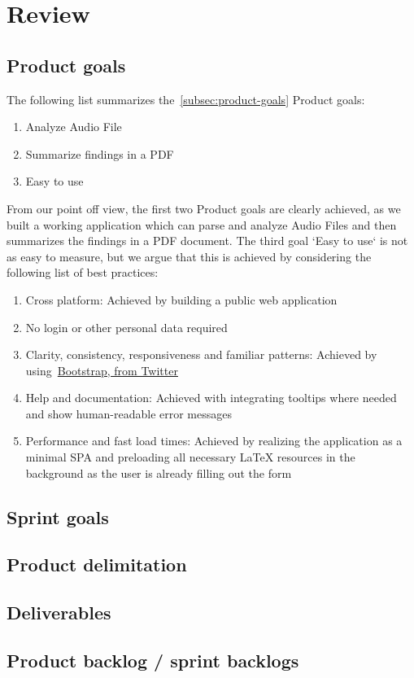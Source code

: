 \section{Review}\label{sec:review}

\subsection{Product goals}\label{subsec:product-goals-review}
The following list summarizes the~\ref{subsec:product-goals} Product goals:

\begin{enumerate}
    \item Analyze Audio File
    \item Summarize findings in a PDF
    \item Easy to use
\end{enumerate}

From our point off view, the first two Product goals are clearly achieved, as we built a working application
which can parse and analyze Audio Files and then summarizes the findings in a PDF document.
The third goal `Easy to use` is not as easy to measure, but we argue that this is achieved by considering the following
list of best practices:

\begin{enumerate}
    \item Cross platform: Achieved by building a public web application
    \item No login or other personal data required
    \item Clarity, consistency, responsiveness and familiar patterns: Achieved by using~\href{https://getbootstrap.com/2.0.2/}{Bootstrap, from Twitter}
    \item Help and documentation: Achieved with integrating tooltips where needed and show human-readable error messages
    \item Performance and fast load times: Achieved by realizing the application as a minimal SPA and preloading all necessary LaTeX resources in the background as the user is already filling out the form
\end{enumerate}

\subsection{Sprint goals}\label{subsec:sprint-goals-review}


\subsection{Product delimitation}\label{subsec:product-delimination-review}


\subsection{Deliverables}\label{subsec:deliverables-review}


\subsection{Product backlog / sprint backlogs}\label{subsec:backlog-review}

